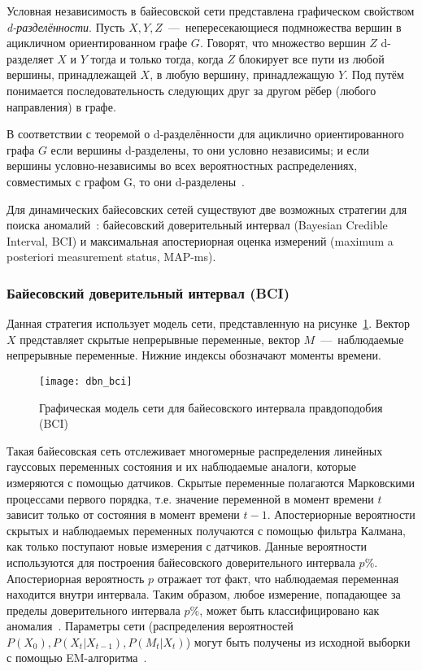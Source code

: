 Условная независимость в байесовской сети представлена графическом свойством \textit{d-разделённости}. Пусть $X, Y, Z$~---~непересекающиеся подмножества вершин в ацикличном ориентированном графе $G$. Говорят, что множество вершин $Z$ d-разделяет $X$ и $Y$ тогда и только тогда, когда $Z$ блокирует все пути из любой вершины, принадлежащей $X$, в любую вершину, принадлежащую $Y$. Под путём понимается последовательность следующих друг за другом рёбер (любого направления) в графе.

В соответствии с теоремой о d-разделённости для ациклично ориентированного графа $G$ если вершины d-разделены, то они условно независимы; и если вершины условно-независимы во всех вероятностных распределениях, совместимых с графом G, то они d-разделены~\cite{PearlDynamicBayesianNetworks}.

Для динамических байесовских сетей существуют две возможных стратегии для поиска аномалий~\cite{DBNAnomalyDetection}: байесовский доверительный интервал (Bayesian Credible Interval, BCI) и максимальная апостериорная оценка измерений (maximum a posteriori measurement status, MAP-ms).

\subsubsection{Байесовский доверительный интервал (BCI)}
\label{subsubsec:spec:DBN:BCI}
Данная стратегия использует модель сети, представленную на рисунке~\ref{fig:spec:DBN:BCI}. Вектор $X$ представляет скрытые непрерывные переменные, вектор $M$~---~наблюдаемые непрерывные переменные. Нижние индексы обозначают моменты времени.

\begin{figure}[h]
\texttt{[image: dbn\_bci]}
\caption{Графическая модель сети для байесовского интервала правдоподобия (BCI)}
\label{fig:spec:DBN:BCI}
\end{figure}

Такая байесовская сеть отслеживает многомерные распределения линейных гауссовых переменных состояния и их наблюдаемые аналоги, которые измеряются с помощью датчиков. Скрытые переменные полагаются Марковскими процессами первого порядка, т.е. значение переменной в момент времени $t$ зависит только от состояния в момент времени $t-1$. Апостериорные вероятности скрытых и наблюдаемых переменных получаются с помощью фильтра Калмана, как только поступают новые измерения с датчиков. Данные вероятности используются для построения байесовского доверительного интервала $p\%$. Апостериорная вероятность $p$ отражает тот факт, что наблюдаемая переменная находится внутри интервала. Таким образом, любое измерение, попадающее за пределы доверительного интервала $p\%$, может быть классифицировано как аномалия~\cite{DBNAnomalyDetection}. Параметры сети (распределения вероятностей $P(X_0), P(X_t|X_{t-1}), P(M_t|X_t)$) могут быть получены из исходной выборки с помощью EM-алгоритма~\cite{KorolevEMAlgo}.

